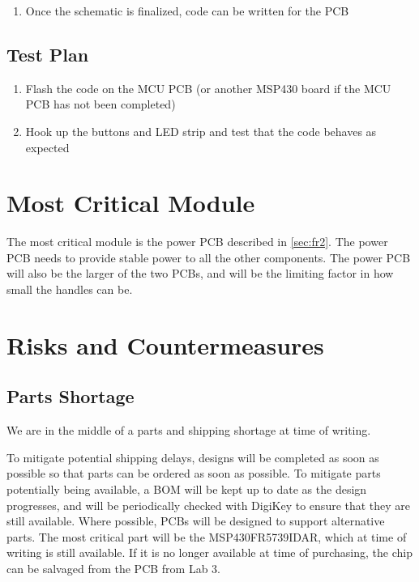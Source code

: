 \documentclass{notes}
\begin{document}
\begin{enumerate}
    \item Once the schematic is finalized, code can be written for the PCB
\end{enumerate}

\subsection{Test Plan}

\begin{enumerate}
    \item Flash the code on the MCU PCB (or another MSP430 board if the MCU PCB has not been completed)
    \item Hook up the buttons and LED strip and test that the code behaves as expected
\end{enumerate}

\section{Most Critical Module}

The most critical module is the power PCB described in \autoref{sec:fr2}.
The power PCB needs to provide stable power to all the other components.
The power PCB will also be the larger of the two PCBs, and will be the limiting factor in how small the handles can be.

\section{Risks and Countermeasures}

\subsection{Parts Shortage}

We are in the middle of a parts and shipping shortage at time of writing.

To mitigate potential shipping delays, designs will be completed as soon as possible so that parts can be ordered as soon as possible.
To mitigate parts potentially being available, a BOM will be kept up to date as the design progresses, and will be periodically checked with DigiKey to ensure that they are still available.
Where possible, PCBs will be designed to support alternative parts.
The most critical part will be the MSP430FR5739IDAR, which at time of writing is still available.
If it is no longer available at time of purchasing, the chip can be salvaged from the PCB from Lab 3.
\end{document}
